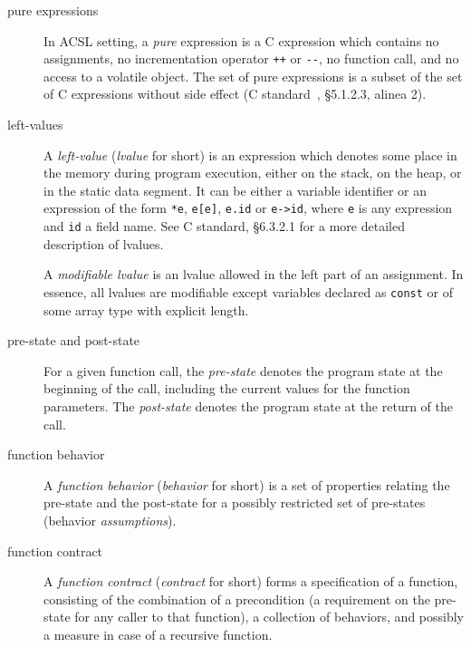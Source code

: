\documentclass[web]{frama-c-book}
\begin{document}
\begin{description}
\item[pure expressions]  In ACSL setting, a
  \emph{pure} expression is a C expression which contains no assignments, no
  incrementation operator \lstinline|++| or \lstinline|--|, no function call,
  and no access to a volatile object. The set of pure expressions is a
  subset of the set of C expressions without side effect (C
  standard~\cite{KR88,standardc99}, \S 5.1.2.3, alinea 2).

\item[left-values] 

  A \emph{left-value} (\emph{lvalue} for short) is an expression which
  denotes some place in the memory during program execution, either on
  the stack, on the heap, or in the static data segment. It can be
  either a variable identifier or an expression of the form \lstinline|*e|,
  \lstinline|e[e]|, \lstinline|e.id| or \lstinline|e->id|, where
  \lstinline |e| is any expression and \lstinline|id| a field name.
  See C standard, \S 6.3.2.1 for a more
  detailed description of lvalues.

  A \emph{modifiable lvalue} is an lvalue allowed in the left part of
  an assignment. In essence, all lvalues are modifiable except
  variables declared as \texttt{const} or of some array type with
  explicit length.

\item[pre-state and post-state]

    For a given function call, the \emph{pre-state} denotes the
    program state at the beginning of the call, including the
    current values for the function parameters. The \emph{post-state}
    denotes the program state at the return of the call.

\item[function behavior]  

  A \emph{function behavior} (\emph{behavior} for short) is a set of
  properties relating the pre-state and the post-state for a
  possibly restricted set of pre-states (behavior \emph{assumptions}).

\item[function contract]  

  A \emph{function contract} (\emph{contract} for short) forms a
  specification of a function, consisting of the combination of a
  precondition (a requirement on the pre-state for any caller to that
  function), a collection of behaviors, and possibly a measure in case
  of a recursive function.

\end{description}
\end{document}
